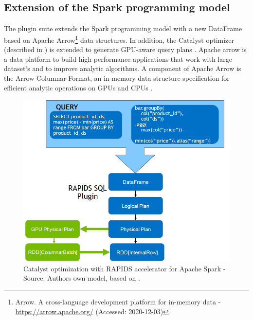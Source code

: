 \subsection{Extension of the Spark programming model}
\label{subsec:04_rapids_ext}
\paragraph{}The plugin suite extends the Spark programming model with a new DataFrame based on Apache Arrow\footnote{Arrow. A cross-language development platform for in-memory data - \url{https://arrow.apache.org/} (Accessed: 2020-12-03)} data structures. In addition, the Catalyst optimizer (described in ) is extended to generate GPU-aware query plans \cite{Mcdonald2020SparkRapids}.
Apache arrow is a data platform to build high performance applications that work with large dataset`s and to improve analytic algorithms. A component of Apache Arrow is the Arrow Columnar Format, an in-memory data structure specification for efficient analytic operations on GPUs and CPUs \cite{ApacheArrow2020Docs}.


\begin{figure}[h]
\centering
\includegraphics[scale=0.25]{images/04_technical_background/rapids_query_plan}
\caption{Catalyst optimization with RAPIDS accelerator for Apache Spark - Source: Authors own model, based on \cite{Mcdonald2020SparkRapids}.}
\label{fig:04_rapids_ext_query-plan}
\end{figure}
